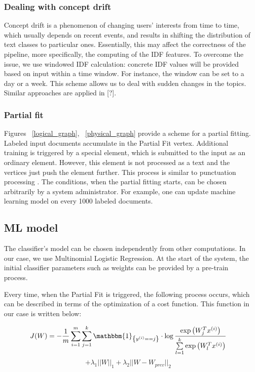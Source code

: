 \subsubsection{Dealing with concept drift}

Concept drift is a phenomenon of changing users' interests from time to time, which usually depends on recent events, and results in shifting the distribution of text classes to particular ones. Essentially, this may affect the correctness of the pipeline, more specifically, the computing of the IDF features. To overcome the issue, we use windowed IDF calculation: concrete IDF values will be provided based on input within a time window. For instance, the window can be set to a day or a week. This scheme allows us to deal with sudden changes in the topics. Similar approaches are applied in [?].

\subsubsection{Partial fit}

Figures ~\ref{logical_graph}, ~\ref{physical_graph} provide a scheme for a partial fitting. Labeled input documents accumulate in the Partial Fit vertex. Additional training is triggered by a special element, which is submitted to the input as an ordinary element. However, this element is not processed as a text and the vertices just push the element further. This process is similar to punctuation processing \cite{tucker2003exploiting}. The conditions, when the partial fitting starts, can be chosen arbitrarily by a system administrator. For example, one can update machine learning model on every 1000 labeled documents.

\subsection{ML model \label{ML}}

The classifier's model can be chosen independently from other computations. In our case, we use Multinomial Logistic Regression. At the start of the system, the initial classifier parameters such as weights can be provided by a pre-train process.

Every time, when the Partial Fit is triggered, the following process occurs, which can be described in terms of the optimization of a cost function. This function in our case is written below:

\begin{center}

$$ J(W) = -\frac{1}{m} \sum \limits_{i = 1}^{m} \sum \limits_{j = 1}^{k} \mathbbm{1}_{\left\{y^{(i)} == j\right\}} \cdot \log \frac{\exp\left({W_{j}^Tx^{(i)}}\right) }{\sum \limits_{l = 1}^{k}  \exp\left({W_{l}^Tx^{(i)}}\right) }$$ 
 $$ +  \lambda_1 ||W||_1 + \lambda_2 ||W - W_{prev}||_2 $$

\end{center} 

